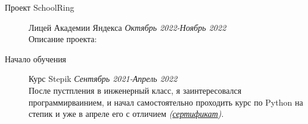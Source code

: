 \documentclass[margin,line]{resume}
\begin{document}
\begin{resume}
\begin{description}
      \item[Проект SchoolRing]\small{Лицей Академии Яндекса \hfill
        \textsl{Октябрь 2022-Ноябрь 2022}}\\
        Описание проекта:
        \vspace{2mm}

      \item[Начало обучения]\small{Курс Stepik
        \hfill \textsl{Сентябрь 2021-Апрель 2022\vspace{2mm}}}\\
        После пустпления в инженерный класс, я заинтересовался
        программирваинием, и начал самостоятельно проходить курс по
        Python на степик и уже в апреле его с отличием
        \textit{(\href{https://github.com/alchemmist/CV/blob/main/attachments/stepik-python-course.pdf}{сертификат})}.

    \end{description}
  \end{resume}
  
\end{document}
